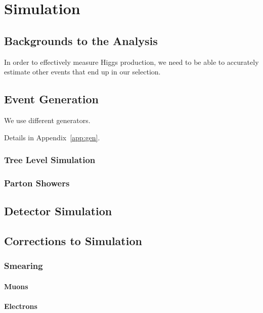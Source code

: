 \chapter{Simulation}

\section{Backgrounds to the Analysis}

In order to effectively measure Higgs production,
we need to be able to accurately estimate other events
that end up in our selection.

\section{Event Generation}

We use different generators.

Details in Appendix~\ref{app:gen}.

\subsection{Tree Level Simulation}

\subsection{Parton Showers}

\section{Detector Simulation}


\section{Corrections to Simulation}

\subsection{Smearing}

\subsubsection{Muons}

\subsubsection{Electrons}

